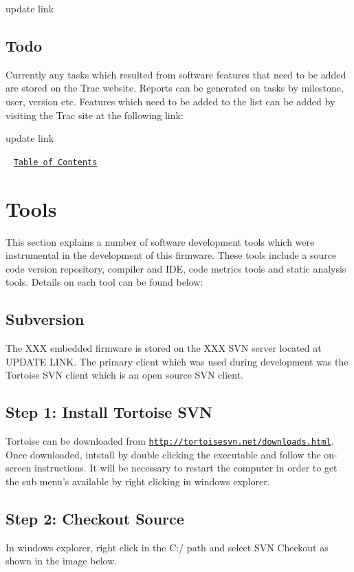 update link\hypertarget{index_ToDo}{}\subsection{Todo}\label{index_ToDo}
Currently any tasks which resulted from software features that need to be added are stored on the Trac website. Reports can be generated on tasks by milestone, user, version etc. Features which need to be added to the list can be added by visiting the Trac site at the following link\+: ~\newline
~\newline


update link

~\newline
\href{#Contents}{\tt Table of Contents}~\newline
 



\label{_Tools}%
\hypertarget{index_DevEnviron}{}\section{Tools}\label{index_DevEnviron}
This section explains a number of software development tools which were instrumental in the development of this firmware. These tools include a source code version repository, compiler and I\+D\+E, code metrics tools and static analysis tools. Details on each tool can be found below\+:\hypertarget{index_subversion}{}\subsection{Subversion}\label{index_subversion}
The X\+X\+X embedded firmware is stored on the X\+X\+X S\+V\+N server located at U\+P\+D\+A\+T\+E L\+I\+N\+K. The primary client which was used during development was the Tortoise S\+V\+N client which is an open source S\+V\+N client.\hypertarget{index_svn1}{}\subsection{Step 1\+: Install Tortoise S\+V\+N}\label{index_svn1}
Tortoise can be downloaded from \href{http://tortoisesvn.net/downloads.html}{\tt http\+://tortoisesvn.\+net/downloads.\+html}. Once downloaded, intstall by double clicking the executable and follow the on-\/screen instructions. It will be necessary to restart the computer in order to get the sub menu's available by right clicking in windows explorer.\hypertarget{index_svn2}{}\subsection{Step 2\+: Checkout Source}\label{index_svn2}
In windows explorer, right click in the C\+:/ path and select S\+V\+N Checkout as shown in the image below. 

